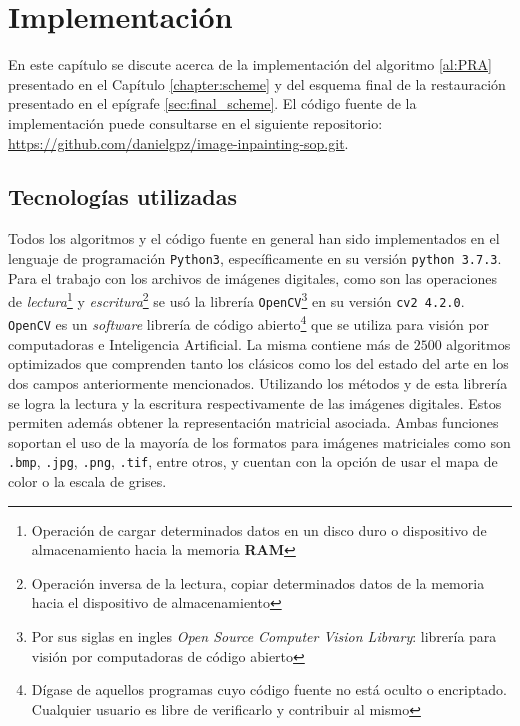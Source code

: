 \chapter{Implementaci\'on}\label{chapter:code}

En este capítulo se discute acerca de la implementación del algoritmo \ref{al:PRA} presentado en el Capítulo \ref{chapter:scheme} y del esquema final de la restauraci\'on presentado en el epígrafe \ref{sec:final_scheme}. El c\'odigo fuente de la implementaci\'on puede consultarse en el siguiente repositorio: \url{https://github.com/danielgpz/image-inpainting-sop.git}.

\section{Tecnolog\'ias utilizadas}
Todos los algoritmos y el c\'odigo fuente en general han sido implementados en el lenguaje de programaci\'on \texttt{Python3}, específicamente en su versi\'on \texttt{python 3.7.3}. Para el trabajo con los archivos de im\'agenes digitales, como son las operaciones de \textit{lectura}\footnote{Operaci\'on de cargar determinados datos en un disco duro o dispositivo de almacenamiento hacia la memoria \textbf{RAM}} y \textit{escritura}\footnote{Operaci\'on inversa de la lectura, copiar determinados datos de la memoria hacia el dispositivo de almacenamiento} se us\'o la librer\'ia \texttt{OpenCV}\footnote{Por sus siglas en ingles \textit{Open Source Computer Vision Library}: librer\'ia para visi\'on por computadoras de c\'odigo abierto} en su versi\'on \texttt{cv2 4.2.0}. \texttt{OpenCV} es un \textit{software} librer\'ia de c\'odigo abierto\footnote{D\'igase de aquellos programas cuyo c\'odigo fuente no est\'a oculto o encriptado. Cualquier usuario es libre de verificarlo y contribuir al mismo} que se utiliza para visi\'on por computadoras e Inteligencia Artificial. La misma contiene m\'as de $2500$ algoritmos optimizados que comprenden tanto los cl\'asicos como los del estado del arte en los dos campos anteriormente mencionados. Utilizando los m\'etodos  y  de esta librer\'ia se logra la lectura y la escritura respectivamente de las im\'agenes digitales. Estos permiten adem\'as obtener la representaci\'on matricial asociada. Ambas funciones soportan el uso de la mayor\'ia de los formatos para imágenes matriciales como son \texttt{.bmp}, \texttt{.jpg}, \texttt{.png}, \texttt{.tif}, entre otros, y cuentan con la opción de usar el mapa de color \RGB o la escala de grises.

